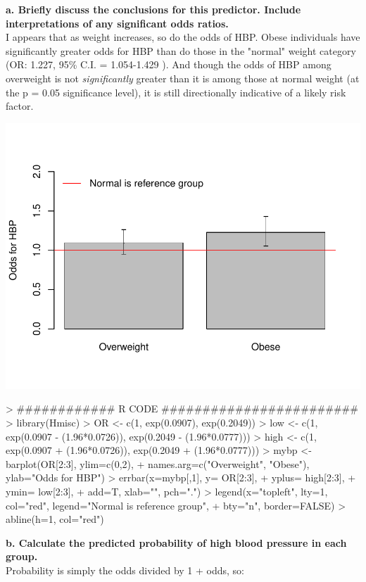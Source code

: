 \documentclass{article}
\begin{document}
\noindent \textbf{a. Briefly discuss the conclusions for this predictor.  Include interpretations of any significant odds ratios.} \\

I appears that as weight increases, so do the odds of HBP.  Obese individuals have significantly greater odds for HBP than do those in the "normal" weight category (OR: 1.227, 95\% C.I. = 1.054-1.429 ).  And though the odds of HBP among overweight is not \emph{significantly} greater than it is among those at normal weight (at the p = 0.05 significance level), it is still directionally indicative of a likely risk factor.  

\includegraphics{exam2-030}

\begin{Schunk}
\begin{Sinput}
> ############ R CODE ########################
> library(Hmisc)
> OR <- c(1, exp(0.0907), exp(0.2049))
> low <- c(1, exp(0.0907 - (1.96*0.0726)), exp(0.2049 - (1.96*0.0777)))
> high <- c(1, exp(0.0907 + (1.96*0.0726)), exp(0.2049 + (1.96*0.0777)))
> mybp <- barplot(OR[2:3], ylim=c(0,2),
+                 names.arg=c("Overweight", "Obese"), ylab="Odds for HBP")
> errbar(x=mybp[,1], y= OR[2:3], 
+        yplus= high[2:3],
+        ymin= low[2:3],
+        add=T, xlab="", pch=".")
> legend(x="topleft", lty=1, col="red", legend="Normal is reference group",
+        bty="n", border=FALSE)
> abline(h=1, col="red")
\end{Sinput}
\end{Schunk}



\noindent \textbf{b. Calculate the predicted probability of high blood pressure in each group.} \\
Probability is simply the odds divided by 1 + odds, so:\\
\end{document}
